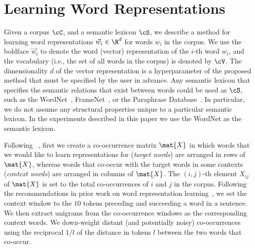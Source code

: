 \documentclass[letterpaper]{article}
\newcommand{\citet}[1]{\citeauthor{#1} \shortcite{#1}}
\newcommand{\citep}{\cite}
\begin{document}
\section{Learning Word Representations}
\label{sec:method}

Given a corpus $\cC$, and a semantic lexicon $\cS$, we describe a method for learning
word representations $\vec{w}_i \in \R^d$ for words $w_i$ in the corpus.
We use the boldface $\vec{w}_i$ to denote the word (vector) representation of
the $i$-th word $w_i$, and the vocabulary (i.e., the set of all words in the corpus) is denoted by $\cV$.
The dimensionality $d$ of the vector representation is a hyperparameter of the proposed method that must be
specified by the user in advance.  Any semantic lexicon that specifies the semantic relations that exist between words could be used as $\cS$,
such as the WordNet~\citep{WordNet}, FrameNet~\citep{baker-fillmore-lowe:1998:ACLCOLING}, or the Paraphrase Database~\citep{ganitkevitch-vandurme-callisonburch:2013:NAACL-HLT}. In particular, we do not assume any structural properties unique to a particular semantic lexicon. In the experiments described in this paper we use the WordNet as the semantic lexicon.

Following~\citet{Pennington:EMNLP:2014}, first we create a co-occurrence matrix $\mat{X}$ in which
words that we would like to learn representations for (\emph{target words}) are arranged in rows of $\mat{X}$, whereas words
that co-occur with the target words in some contexts (\emph{context words}) are arranged in columns of $\mat{X}$.
The $(i,j)$-th element $X_{ij}$ of $\mat{X}$ is set to the total co-occurrences of $i$ and $j$ in the corpus.
Following the recommendations in prior work on word representation learning~\citep{Levy:TACL:2015},
we set the context window to the $10$ tokens preceding and succeeding a word in a sentence.
We then extract unigrams from the co-occurrence windows
 as the corresponding context words. We down-weight distant (and potentially noisy) co-occurrences
 using the reciprocal $1/l$ of the distance in tokens $l$ between the two words that co-occur.
\end{document}
